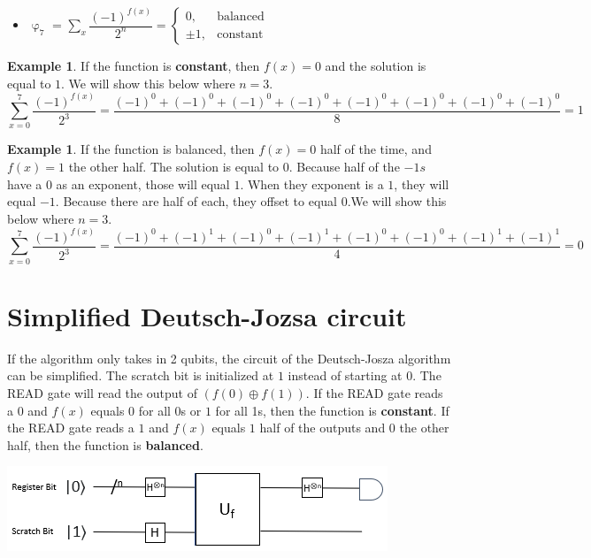 \documentclass[12pt]{article}
\theoremstyle{definition}
\newtheorem{example}[theorem]{Example}
\begin{document}
\begin{itemize}
\item $\upvarphi_7$ = 
   $ \sum_x\dfrac{(-1)^{f(x)}}{2^n}= 
    \begin{cases}
      0, & \text{balanced} \\
      \pm1, & \text{constant}
    \end{cases}$
\end{itemize}
\begin{example}
If the function is \textbf{constant}, then $f(x) =0$ and the solution is equal to $1$. We will show this below where $n=3$.
\[\sum_{x=0}^{7}\dfrac{(-1)^{f(x)}}{2^3}= \dfrac{(-1)^0+(-1)^0+(-1)^0+(-1)^0+(-1)^0+(-1)^0+(-1)^0+(-1)^0}{8}=1\]
\end{example}
\begin{example}
If the function is balanced, then $f(x) =0$ half of the time, and $f(x) = 1$ the other half. The solution is equal to 0. Because half of the $-1s$ have a $0$ as an exponent, those will equal $1$. When they exponent is a $1$, they will equal $-1$. Because there are half of each, they offset to equal $0$.We will show this below where $n=3$.
\[\sum_{x=0}^{7}\dfrac{(-1)^{f(x)}}{2^3}= \dfrac{(-1)^0+(-1)^1+(-1)^0+(-1)^1+(-1)^0+(-1)^0+(-1)^1+(-1)^1}{4}=0\]
\end{example}


\section{Simplified Deutsch-Jozsa circuit}
If the algorithm only takes in 2 qubits, the circuit of the Deutsch-Josza algorithm can be simplified. The scratch bit is initialized at $1$ instead of starting at $0$. The READ gate will read the output of $(f(0) \oplus f(1))$. If the READ gate reads a $0$ and $f(x)$ equals $0$ for all 0s or $1$ for all 1s, then the function is \textbf{constant}. If the READ gate reads a $1$ and $f(x)$ equals $1$ half of the outputs and $0$ the other half, then the function is \textbf{balanced}.

\begin{center}
    \includegraphics[]{revised.PNG}
\end{center}
\end{document}
